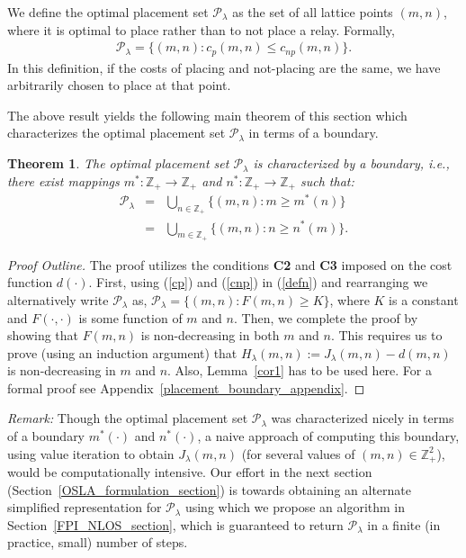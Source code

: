 \documentclass[conference]{IEEEtran}
\newtheorem{theorem}{Theorem}
\begin{document}
We define the optimal placement set $\mathcal{P}_\lambda$ as the set of all lattice points $(m,n)$, 
where it is optimal to place rather than to not place a relay. Formally,
\begin{eqnarray}
\label{defn}
\mathcal{P}_\lambda=\Big\{(m,n):c_p(m,n)\leq c_{np}(m,n)\Big\}.
\end{eqnarray}
In this definition, if the costs of placing and not-placing are the
same, we have arbitrarily chosen to place at that point.


The above result yields the following main theorem of this section
which characterizes the optimal placement set $\mathcal{P}_\lambda$ in
terms of a boundary.
\begin{theorem} 
\label{placement_boundary}
The optimal placement set $\mathcal{P}_\lambda$ is characterized by a boundary, i.e., there exist 
mappings  $m^*:\mathbb{Z}_+\rightarrow \mathbb{Z}_+$ and  $n^*:\mathbb{Z}_+\rightarrow \mathbb{Z}_+$ such that:
\begin{eqnarray}
\mathcal{P}_\lambda&=&\bigcup_{n\in\mathbb{Z}_+}\{(m,n): m\geq m^*(n)\}  \label{set11}\\
&=&\bigcup_{m\in\mathbb{Z}_+}\{(m,n): n\geq n^*(m)\}.\label{set22}
\end{eqnarray}
\end{theorem}
\begin{proof}[Proof Outline]
  The proof utilizes the conditions \textbf{C2} and \textbf{C3}
  imposed on the cost function $d(\cdot)$. First, using (\ref{cp}) and
  (\ref{cnp}) in (\ref{defn}) and rearranging we alternatively write
  $\mathcal{P}_\lambda$ as, $\mathcal{P}_\lambda=\{(m,n): F(m,n)\ge
  K\}$, where $K$ is a constant and $F(\cdot,\cdot)$ is some function
  of $m$ and $n$. Then, we complete the proof by showing that $F(m,n)$
  is non-decreasing in both $m$ and $n$. This requires us to prove
  (using an induction argument) that $H_{\lambda}(m,n):=
  J_{\lambda}(m,n)-d(m,n)$ is non-decreasing in $m$ and $n$. Also,
  Lemma~\ref{cor1} has to be used here. For a formal proof see
  Appendix~\ref{placement_boundary_appendix}.
\end{proof}


\emph{Remark:} Though the optimal placement set $\mathcal{P}_\lambda$
was characterized nicely in terms of a boundary $m^*(\cdot)$ and
$n^*(\cdot)$, a naive approach of computing this boundary, using value
iteration to obtain $J_\lambda(m,n)$ (for several values of
$(m,n)\in\mathbb{Z}_+^2$), would be computationally intensive. Our
effort in the next section (Section~\ref{OSLA_formulation_section}) is
towards obtaining an alternate simplified representation for
$\mathcal{P}_\lambda$ using which we propose an algorithm in
Section~\ref{FPI_NLOS_section}, which is guaranteed to return
$\mathcal{P}_\lambda$ in a finite (in practice, small) number of
steps.
\end{document}
